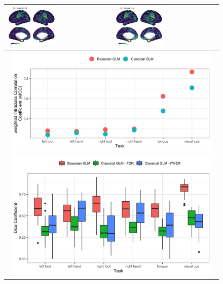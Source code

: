 \documentclass{article}
\begin{document}
\begin{figure}
	\begin{tabularx}{\textwidth}{|X|X|}
		\hline
		\includegraphics[width=0.48\textwidth]{plots/601_subject_classical_tongue_icc.png} &
		\includegraphics[width=0.48\textwidth]{plots/601_subject_bayes_tongue_icc.png} \\ \hline
		\multicolumn{2}{c}{\includegraphics[width=0.96\textwidth]{plots/601_wicc_plot.png}} \\
		\multicolumn{2}{c}{\includegraphics[width=0.96\textwidth]{plots/601_dice_plot.png}} \\ \hline

\end{tabularx}
\end{figure}
\end{document}

